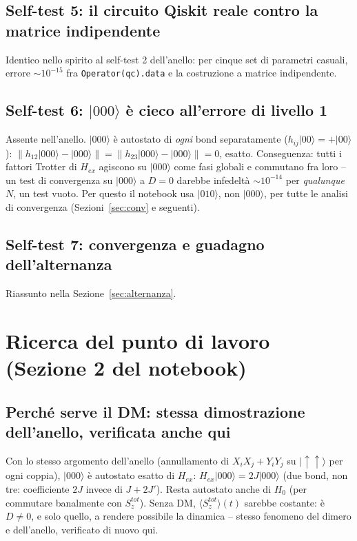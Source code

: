 \documentclass[11pt,a4paper]{article}
\newcommand{\ket}[1]{\lvert #1 \rangle}
\begin{document}
\subsection{Self-test 5: il circuito Qiskit reale contro la matrice indipendente}

Identico nello spirito al self-test 2 dell'anello: per cinque set di parametri casuali, errore $\sim10^{-15}$ fra \texttt{Operator(qc).data} e la costruzione a matrice indipendente.

\subsection{Self-test 6: $\ket{000}$ è cieco all'errore di livello 1}
\label{subsec:st6}

Assente nell'anello. $\ket{000}$ è autostato di \emph{ogni} bond separatamente ($h_{ij}\ket{00}=+\ket{00}$): $\|h_{12}\ket{000}-\ket{000}\|=\|h_{23}\ket{000}-\ket{000}\|=0$, esatto. Conseguenza: tutti i fattori Trotter di $H_{ex}$ agiscono su $\ket{000}$ come fasi globali e commutano fra loro -- un test di convergenza su $\ket{000}$ a $D=0$ darebbe infedeltà $\sim10^{-14}$ per \emph{qualunque} $N$, un test vuoto. Per questo il notebook usa $\ket{010}$, non $\ket{000}$, per tutte le analisi di convergenza (Sezioni~\ref{sec:conv} e seguenti).

\subsection{Self-test 7: convergenza e guadagno dell'alternanza}

Riassunto nella Sezione~\ref{sec:alternanza}.

\section{Ricerca del punto di lavoro (Sezione 2 del notebook)}
\label{sec:ricerca-punto}

\subsection{Perché serve il DM: stessa dimostrazione dell'anello, verificata anche qui}

Con lo stesso argomento dell'anello (annullamento di $X_iX_j+Y_iY_j$ su $\ket{\uparrow\uparrow}$ per ogni coppia), $\ket{000}$ è autostato esatto di $H_{ex}$: $H_{ex}\ket{000}=2J\ket{000}$ (due bond, non tre: coefficiente $2J$ invece di $J{+}2J'$). Resta autostato anche di $H_0$ (per commutare banalmente con $S_z^{tot}$). Senza DM, $\langle S_z^{tot}\rangle(t)$ sarebbe costante: è $D\neq0$, e solo quello, a rendere possibile la dinamica -- stesso fenomeno del dimero e dell'anello, verificato di nuovo qui.
\end{document}
